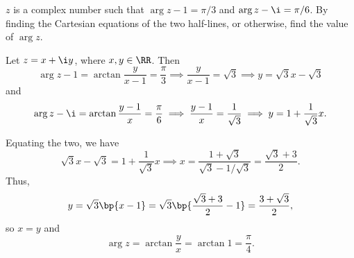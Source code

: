 \begin{problem}
    $z$ is a complex number such that $\arg{z - 1} = \pi/3$ and $\arg{z - \i} = \pi/6$. By finding the Cartesian equations of the two half-lines, or otherwise, find the value of $\arg{z}$.
\end{problem}
\begin{solution}
    Let $z = x + \i y$, where $x, y \in \RR$. Then \[\arg{z-1} = \arctan \frac{y}{x-1} = \frac\pi3 \implies \frac{y}{x-1} = \sqrt{3} \implies y = \sqrt{3} x - \sqrt3\] and \[\arg{z-\i} = \arctan \frac{y-1}{x} = \frac{\pi}6 \implies \frac{y-1}{x} = \frac1{\sqrt3} \implies y = 1 + \frac1{\sqrt3} x.\]

    Equating the two, we have \[\sqrt{3} x - \sqrt3 = 1 + \frac1{\sqrt3} x \implies x = \frac{1 + \sqrt{3}}{\sqrt3 - 1/\sqrt3} = \frac{\sqrt3 + 3}{2}.\] Thus, \[y = \sqrt{3} \bp{x - 1} = \sqrt{3} \bp{\frac{\sqrt3 + 3}{2} - 1} = \frac{3 + \sqrt3}{2},\] so $x = y$ and \[\arg z = \arctan \frac{y}{x} = \arctan 1 = \frac\pi4.\]
\end{solution}

